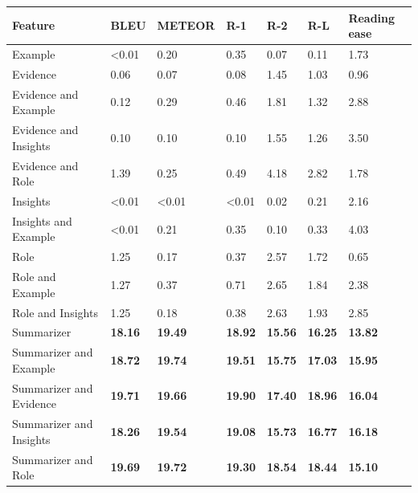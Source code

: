 \begin{tabular}{|l|l|l|l|l|l|l|}
\hline
\textbf{Feature} & BLEU & METEOR & R-1 & R-2 & R-L & Reading ease \\
 \hline
 Example & \textless{}0.01 & 0.20 & 0.35 & 0.07 & 0.11 & 1.73 \\
 \hline
 Evidence & 0.06 & 0.07 & 0.08 & 1.45 & 1.03 & 0.96 \\
 \hline
 Evidence and Example & 0.12 & 0.29 & 0.46 & 1.81 & 1.32 & 2.88 \\
 \hline
 Evidence and Insights & 0.10 & 0.10 & 0.10 & 1.55 & 1.26 & 3.50 \\
 \hline
 Evidence and Role & 1.39 & 0.25 & 0.49 & 4.18 & 2.82 & 1.78 \\
 \hline
 Insights & \textless{}0.01 & \textless{}0.01 & \textless{}0.01 & 0.02 & 0.21 & 2.16 \\
 \hline
 Insights and Example & \textless{}0.01 & 0.21 & 0.35 & 0.10 & 0.33 & 4.03 \\
 \hline
 Role & 1.25 & 0.17 & 0.37 & 2.57 & 1.72 & 0.65 \\
 \hline
 Role and Example & 1.27 & 0.37 & 0.71 & 2.65 & 1.84 & 2.38 \\
 \hline
 Role and Insights & 1.25 & 0.18 & 0.38 & 2.63 & 1.93 & 2.85 \\
 \hline
 Summarizer & \textbf{18.16} & \textbf{19.49} & \textbf{18.92} & \textbf{15.56} & \textbf{16.25} & \textbf{13.82} \\
 \hline
 Summarizer and Example & \textbf{18.72} & \textbf{19.74} & \textbf{19.51} & \textbf{15.75} & \textbf{17.03} & \textbf{15.95} \\
 \hline
 Summarizer and Evidence & \textbf{19.71} & \textbf{19.66} & \textbf{19.90} & \textbf{17.40} & \textbf{18.96} & \textbf{16.04} \\
 \hline
 Summarizer and Insights & \textbf{18.26} & \textbf{19.54} & \textbf{19.08} & \textbf{15.73} & \textbf{16.77} & \textbf{16.18} \\
 \hline
 Summarizer and Role & \textbf{19.69} & \textbf{19.72} & \textbf{19.30} & \textbf{18.54} & \textbf{18.44} & \textbf{15.10} \\
\hline
\end{tabular}
